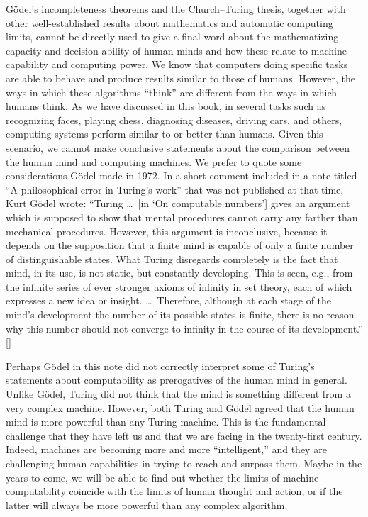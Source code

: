 G\"{o}del's incompleteness theorems and the Church--Turing thesis, together with other well-established results about mathematics and automatic computing limits, cannot be directly used to give a final word about the mathematizing capacity and decision ability of human minds and how these relate to machine capability and computing power. We know that computers doing specific tasks are able to behave and produce results similar to those of humans. However, the ways in which these algorithms ``think'' are different from the ways in which humans think. As we have discussed in this book, in several tasks such as recognizing faces, playing chess, diagnosing diseases, driving cars, and others, computing systems perform similar to or better than humans. Given this scenario, we cannot make conclusive statements about the comparison between the human mind and computing machines. We prefer to quote some considerations G\"{o}del made in 1972. In a short comment included in a note titled ``A philosophical error in Turing's work'' that was not published at that time, Kurt G\"{o}del wrote: ``Turing \dots\ [in `On computable numbers'] gives an argument which is supposed to show that mental procedures cannot carry any farther than mechanical procedures. However, this argument is inconclusive, because it depends on the supposition that a finite mind is capable of only a finite number of distinguishable states. What Turing disregards completely is the fact that mind, in its use, is not static, but constantly developing. This is seen, e.g., from the infinite series of ever stronger axioms of infinity in set theory, each of which expresses a new idea or insight. \dots\ Therefore, although at each stage of the mind's development the number of its possible states is finite, there is no reason why this number should not converge to infinity in the course of its development.'' [\citealt{chap:11:Wang:1974}]

Perhaps G\"{o}del in this note did not correctly interpret some of Turing's statements about computability as prerogatives of the human mind in general. Unlike G\"{o}del, Turing did not think that the mind is something different from a very complex machine. However, both Turing and G\"{o}del agreed that the human mind is more powerful than any Turing machine. This is the fundamental challenge that they have left us and that we are facing in the twenty-first century. Indeed, machines are becoming more and more ``intelligent,'' and they are challenging human capabilities in trying to reach and surpass them. Maybe in the years to come, we will be able to find out whether the limits of machine computability coincide with the limits of human thought and action, or if the latter will always be more powerful than any complex algorithm.

